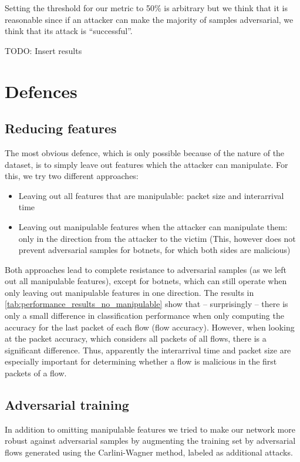 \documentclass[conference]{IEEEtran}
\newcommand\note[2]{{\color{#1}#2}}
\newcommand\todo[1]{{\note{red}{TODO: #1}}}
\begin{document}
Setting the threshold for our metric to 50\% is arbitrary but we think that it is reasonable since if an attacker can make the majority of samples adversarial, we think that its attack is ``successful''.

\todo{Insert results}

\section{Defences}

\subsection{Reducing features}
The most obvious defence, which is only possible because of the nature of the dataset, is to simply leave out features which the attacker can manipulate. For this, we try two different approaches:
\begin{itemize}
\item Leaving out all features that are manipulable: packet size and interarrival time
\item Leaving out manipulable features when the attacker can manipulate them: only in the direction from the attacker to the victim (This, however does not prevent adversarial samples for botnets, for which both sides are malicious)
\end{itemize}

Both approaches lead to complete resistance to adversarial samples (as we left out all manipulable features), except for botnets, which can still operate when only leaving out manipulable features in one direction. The results in \autoref{tab:performance_results_no_manipulable} show that -- surprisingly -- there is only a small difference in classification performance when only computing the accuracy for the last packet of each flow (flow accuracy). However, when looking at the packet accuracy, which considers all packets of all flows, there is a significant difference. Thus, apparently the interarrival time and packet size are especially important for determining whether a flow is malicious in the first packets of a flow.

\subsection{Adversarial training}
In addition to omitting manipulable features we tried to make our network more robust against adversarial samples by augmenting the training set by adversarial flows generated using the Carlini-Wagner method, labeled as additional attacks.
\end{document}
